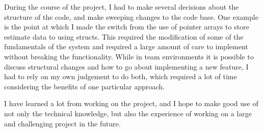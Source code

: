 \documentclass[a4paper,11pt]{article}
\begin{document}
   During the course of the project, I had to make several decisions about the
   structure of the code, and make sweeping changes to the code base. One
   example is the point at which I made the switch from the use of pointer
   arrays to store estimate data to using structs. This required the
   modification of some of the fundamentals of the system and required a large
   amount of care to implement without breaking the functionality. While in team
   environments it is possible to discuss structural changes and how to go about
   implementing a new feature, I had to rely on my own judgement to do both,
   which required a lot of time considering the benefits of one particular
   approach.

   I have learned a lot from working on the project, and I hope to make good use
   of not only the technical knowledge, but also the experience of working on a
   large and challenging project in the future.
\end{document}
